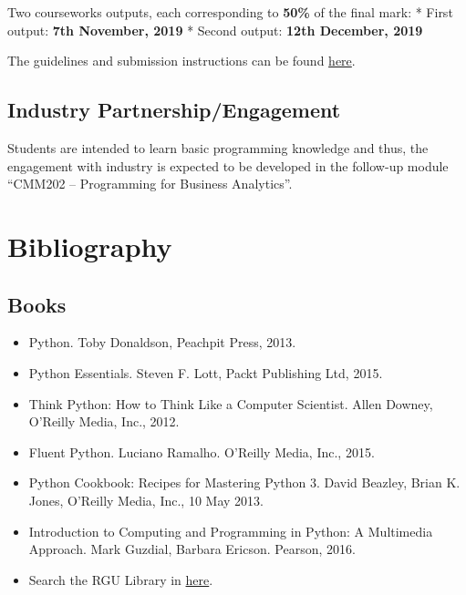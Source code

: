\documentclass[11pt]{article}
\providecommand{\tightlist}{%
      \setlength{\itemsep}{0pt}\setlength{\parskip}{0pt}}
\begin{document}
Two courseworks outputs, each corresponding to \textbf{50\%} of the
final mark: * First output: \textbf{7th November, 2019} * Second output:
\textbf{12th December, 2019}

The guidelines and submission instructions can be found
\href{http://campusmoodle.rgu.ac.uk/course/view.php?id=96406}{here}.

    \hypertarget{industry-partnershipengagement}{%
\subsection{Industry
Partnership/Engagement}\label{industry-partnershipengagement}}

Students are intended to learn basic programming knowledge and thus, the
engagement with industry is expected to be developed in the follow-up
module ``CMM202 -- Programming for Business Analytics''.

    \hypertarget{bibliography}{%
\section{Bibliography}\label{bibliography}}

    \hypertarget{books}{%
\subsection{Books}\label{books}}

\begin{itemize}
\tightlist
\item
  Python. Toby Donaldson, Peachpit Press, 2013.
\item
  Python Essentials. Steven F. Lott, Packt Publishing Ltd, 2015.
\item
  Think Python: How to Think Like a Computer Scientist. Allen Downey,
  O'Reilly Media, Inc., 2012.
\item
  Fluent Python. Luciano Ramalho. O'Reilly Media, Inc., 2015.
\item
  Python Cookbook: Recipes for Mastering Python 3. David Beazley, Brian
  K. Jones, O'Reilly Media, Inc., 10 May 2013.
\item
  Introduction to Computing and Programming in Python: A Multimedia
  Approach. Mark Guzdial, Barbara Ericson. Pearson, 2016.
\item
  Search the RGU Library in
  \href{https://librarysearch.rgu.ac.uk/discovery/search?query=any,contains,python\&tab=Everything\&search_scope=MyInst_and_CI\&vid=44RGU_INST:VU1\&offset=0}{here}.
\end{itemize}
\end{document}
